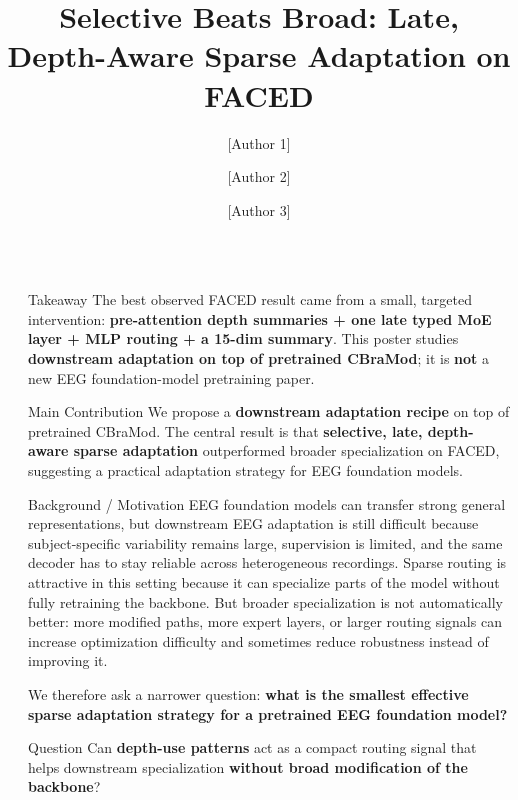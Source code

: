 \documentclass[final]{beamer}
\title{Selective Beats Broad: Late, Depth-Aware Sparse Adaptation on FACED}
\author{[Author 1] \inst{1} \and [Author 2] \inst{1} \and [Author 3] \inst{1}}
\institute[shortinst]{\inst{1} [Lab / Department / University]}
\newlength{\sepwidth}
\newlength{\colwidth}
\newcommand{\separatorcolumn}{\begin{column}{\sepwidth}\end{column}}
\begin{document}
\begin{frame}[t]
\begin{columns}[t]
\separatorcolumn

\begin{column}{\colwidth}

  \begin{alertblock}{Takeaway}
    \small
    The best observed FACED result came from a small, targeted intervention:
    \textbf{pre-attention depth summaries + one late typed MoE layer + MLP
    routing + a 15-dim summary}. This poster studies \textbf{downstream
    adaptation on top of pretrained CBraMod}; it is \textbf{not} a new EEG
    foundation-model pretraining paper.
  \end{alertblock}

  \begin{block}{Main Contribution}
    \small
    We propose a \textbf{downstream adaptation recipe} on top of pretrained
    CBraMod. The central result is that \textbf{selective, late, depth-aware
    sparse adaptation} outperformed broader specialization on FACED, suggesting
    a practical adaptation strategy for EEG foundation models.
  \end{block}

  \begin{block}{Background / Motivation}
    \small
    EEG foundation models can transfer strong general representations, but
    downstream EEG adaptation is still difficult because subject-specific
    variability remains large, supervision is limited, and the same decoder has
    to stay reliable across heterogeneous recordings. Sparse routing is
    attractive in this setting because it can specialize parts of the model
    without fully retraining the backbone. But broader specialization is not
    automatically better: more modified paths, more expert layers, or larger
    routing signals can increase optimization difficulty and sometimes reduce
    robustness instead of improving it.

    \vspace{0.4cm}
    We therefore ask a narrower question:
    \textbf{what is the smallest effective sparse adaptation strategy for a
    pretrained EEG foundation model?}
  \end{block}

  \begin{block}{Question}
    \small
    Can \textbf{depth-use patterns} act as a compact routing signal that helps
    downstream specialization \textbf{without broad modification of the
    backbone}?
  \end{block}


\end{column}
\end{columns}
\end{frame}
\end{document}
